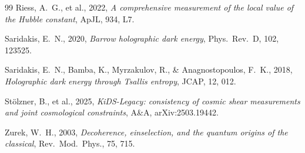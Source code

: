 \documentclass[12pt]{article}
\begin{document}
\begin{thebibliography}{99}
Riess, A.~G., et al., 2022,
\textit{A comprehensive measurement of the local value of the Hubble constant},
ApJL, 934, L7.

Saridakis, E.~N., 2020,
\textit{Barrow holographic dark energy},
Phys.\ Rev.\ D, 102, 123525.

Saridakis, E.~N., Bamba, K., Myrzakulov, R., \& Anagnostopoulos, F.~K., 2018,
\textit{Holographic dark energy through Tsallis entropy},
JCAP, 12, 012.

St\"{o}lzner, B., et al., 2025,
\textit{KiDS-Legacy: consistency of cosmic shear measurements and joint cosmological constraints},
A\&A, arXiv:2503.19442.

Zurek, W.~H., 2003,
\textit{Decoherence, einselection, and the quantum origins of the classical},
Rev.\ Mod.\ Phys., 75, 715.

\end{thebibliography}
\end{document}
